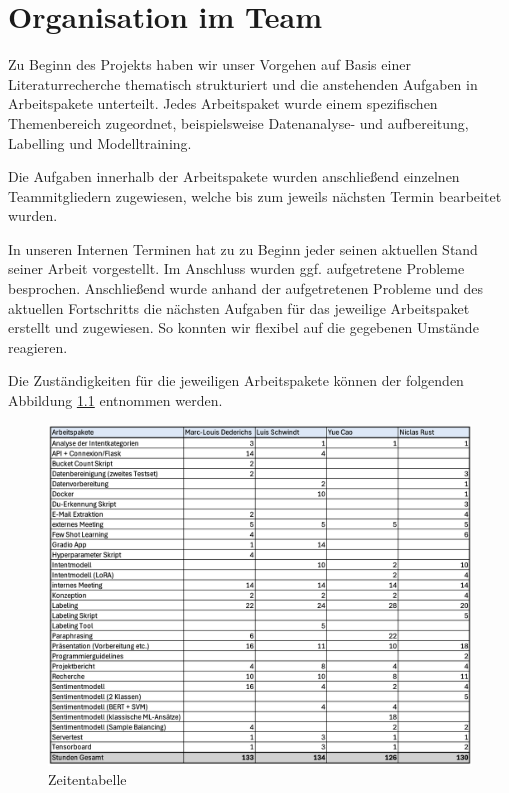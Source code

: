 \chapter{Organisation im Team}

Zu Beginn des Projekts haben wir unser Vorgehen auf Basis einer Literaturrecherche thematisch 
strukturiert und die anstehenden Aufgaben in Arbeitspakete unterteilt. Jedes Arbeitspaket wurde 
einem spezifischen Themenbereich zugeordnet, beispielsweise Datenanalyse- und aufbereitung, 
Labelling und Modelltraining.

Die Aufgaben innerhalb der Arbeitspakete wurden anschließend einzelnen Teammitgliedern 
zugewiesen, welche bis zum jeweils nächsten Termin bearbeitet wurden.

In unseren Internen Terminen hat zu zu Beginn jeder seinen aktuellen Stand seiner Arbeit vorgestellt. Im Anschluss wurden ggf. aufgetretene Probleme 
besprochen. Anschließend wurde anhand der aufgetretenen Probleme und des aktuellen Fortschritts 
die nächsten Aufgaben für das jeweilige Arbeitspaket erstellt und zugewiesen. So konnten wir 
flexibel auf die gegebenen Umstände reagieren. 

Die Zuständigkeiten für die jeweiligen Arbeitspakete können der folgenden Abbildung \ref{fig:Zeitentabelle}
entnommen werden. 

\begin{figure}
\includegraphics[width=\linewidth]{bilder/Zeitentabelle.png}
\caption[Zeitentabelle]{Zeitentabelle}
\label{fig:Zeitentabelle}
\end{figure}